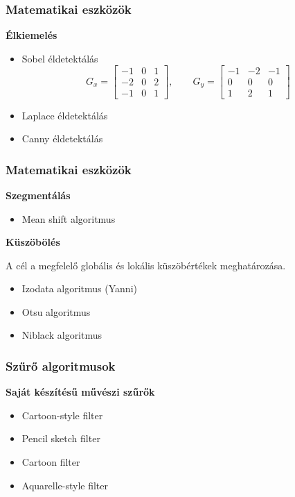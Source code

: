 \documentclass{beamer}
\begin{document}
\begin{frame}[fragile]
\frametitle{Matematikai eszközök}
\textbf{Élkiemelés}

\begin{itemize}
\item
Sobel éldetektálás
$$
G_x =
\begin{bmatrix}
-1&0  &1 \\ 
-2&0  &2 \\ 
-1&0  &1 
\end{bmatrix},
\qquad
G_y =
\begin{bmatrix}
-1&-2  &-1 \\ 
0&0  &0 \\ 
1&2  &1 
\end{bmatrix}
$$
\item Laplace éldetektálás
\item Canny éldetektálás
\end{itemize}

\end{frame}

\begin{frame}[fragile]
\frametitle{Matematikai eszközök}

\textbf{Szegmentálás}

\begin{itemize}
\item Mean shift algoritmus
\end{itemize}

\bigskip

\textbf{Küszöbölés}

A cél a megfelelő globális és lokális küszöbértékek meghatározása.

\begin{itemize}
\item Izodata algoritmus (Yanni)
\item Otsu algoritmus
\item Niblack algoritmus
\end{itemize}

\end{frame}

\begin{frame}[fragile]
\frametitle{Szűrő algoritmusok}

\textbf{Saját készítésű művészi szűrők}

\begin{itemize}
\item Cartoon-style filter
\item Pencil sketch filter
\item Cartoon filter
\item Aquarelle-style filter
\end{itemize}

\end{frame}
\end{document}
